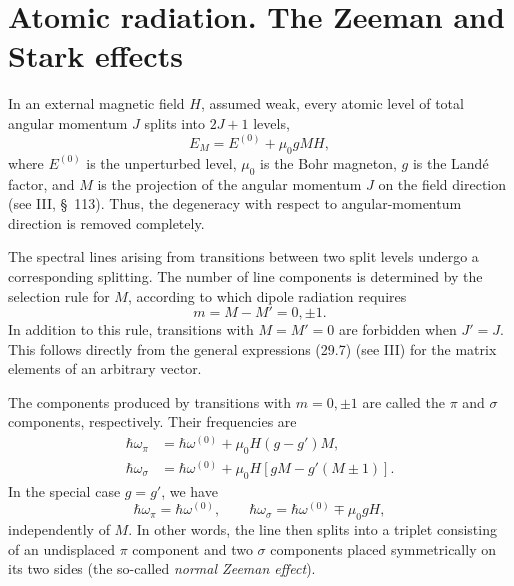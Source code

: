\section{Atomic radiation. The Zeeman and Stark effects}

In an external magnetic field $H$, assumed weak, every atomic level of total angular momentum $J$ splits into $2J+1$ levels,
\begin{equation}
E_M=E^{(0)}+\mu_0gMH,
\tag{51.1}
\end{equation}
where $E^{(0)}$ is the unperturbed level, $\mu_0$ is the Bohr magneton, $g$ is the Landé factor, and $M$ is the projection of the angular momentum $J$ on the field direction (see III, \S~113). Thus, the degeneracy with respect to angular-momentum direction is removed completely.

The spectral lines arising from transitions between two split levels undergo a corresponding splitting. The number of line components is determined by the selection rule for $M$, according to which dipole radiation requires
\begin{equation}
m=M-M'=0,\pm1.
\tag{51.2}
\end{equation}
In addition to this rule, transitions with $M=M'=0$ are forbidden when $J'=J$. This follows directly from the general expressions (29.7) (see III) for the matrix elements of an arbitrary vector.

The components produced by transitions with $m=0,\pm1$ are called the $\pi$ and $\sigma$ components, respectively. Their frequencies are
\begin{equation}
\begin{aligned}
\hbar\omega_\pi&=\hbar\omega^{(0)}+\mu_0H(g-g')M,\\
\hbar\omega_\sigma&=\hbar\omega^{(0)}+\mu_0H[gM-g'(M\pm1)].
\end{aligned}
\tag{51.3}
\end{equation}
In the special case $g=g'$, we have
\begin{equation}
\hbar\omega_\pi=\hbar\omega^{(0)},\qquad
\hbar\omega_\sigma=\hbar\omega^{(0)}\mp\mu_0gH,
\tag{51.4}
\end{equation}
independently of $M$. In other words, the line then splits into a triplet consisting of an undisplaced $\pi$ component and two $\sigma$ components placed symmetrically on its two sides (the so-called \emph{normal Zeeman effect}).

